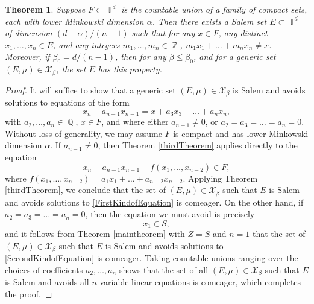 \documentclass[dvipsnames,letterpaper,12pt]{article}
\numberwithin{equation}{section}
\DeclareMathOperator{\ZZ}{\mathbb{Z}}
\DeclareMathOperator{\QQ}{\mathbb{Q}}
\DeclareMathOperator{\TT}{\mathbb{T}}
\newtheorem{theorem}{Theorem}
\numberwithin{theorem}{section}
\begin{document}
\begin{theorem} \label{dDimensionalKornerResult}
    Suppose $F \subset \TT^d$ is the countable union of a family of compact sets, each with lower Minkowski dimension $\alpha$. Then there exists a Salem set $E \subset \TT^d$ of dimension $(d - \alpha)/(n-1)$ such that for any $x \in F$, any distinct $x_1,\dots,x_n \in E$, and any integers $m_1,\dots,m_n \in \ZZ$, $m_1x_1 + \dots + m_nx_n \neq x$. Moreover, if $\beta_0 = d/(n-1)$, then for any $\beta \leq \beta_0$, and for a generic set $(E,\mu) \in \mathcal{X}_\beta$, the set $E$ has this property.
\end{theorem}
\begin{proof}
    It will suffice to show that a generic set $(E,\mu) \in \mathcal{X}_\beta$ is Salem and avoids solutions to equations of the form
    \begin{equation} \label{equationOIDJDIOJOIJ2131232143fdfef}
        x_n - a_{n-1} x_{n-1} = x + a_3x_3 + \dots + a_nx_n,
    \end{equation}
    with $a_2,\dots,a_n \in \QQ$, $x \in F$, and where either $a_{n-1} \neq 0$, or $a_2 = a_3 = \dots = a_n = 0$. Without loss of generality, we may assume $F$ is compact and has lower Minkowski dimension $\alpha$. If $a_{n-1} \neq 0$, then Theorem \ref{thirdTheorem} applies directly to the equation
    \begin{equation} \label{FirstKindofEquation}
        x_n - a_{n-1} x_{n-1} - f(x_1,\dots,x_{n-2}) \in F,
    \end{equation}
    where $f(x_1,\dots,x_{n-2}) = a_1x_1 + \dots + a_{n-2}x_{n-2}$. Applying Theorem \ref{thirdTheorem}, we conclude that the set of $(E,\mu) \in \mathcal{X}_\beta$ such that $E$ is Salem and avoids solutions to \eqref{FirstKindofEquation} is comeager. On the other hand, if $a_2 = a_3 = \dots = a_n = 0$, then the equation we must avoid is precisely
    \begin{equation} \label{SecondKindofEquation}
        x_1 \in S,
    \end{equation}
    and it follows from Theorem \ref{maintheorem} with $Z = S$ and $n = 1$ that the set of $(E,\mu) \in \mathcal{X}_\beta$ such that $E$ is Salem and avoids solutions to \eqref{SecondKindofEquation} is comeager. Taking countable unions ranging over the choices of coefficients $a_2,\dots,a_n$ shows that the set of all $(E,\mu) \in \mathcal{X}_\beta$ such that $E$ is Salem and avoids all $n$-variable linear equations is comeager, which completes the proof.
\end{proof}
\end{document}
